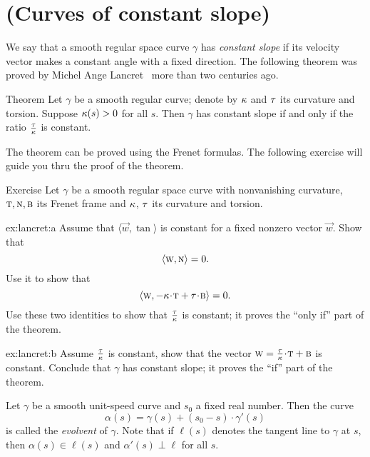 \section{(Curves of constant slope)}

We say that a smooth regular space curve $\gamma$ has \emph{constant slope} if its velocity vector makes a constant angle with a fixed direction.
The following theorem was proved by Michel Ange Lancret~\cite{lancret} more than two centuries ago.

\begin{thm}{Theorem}\label{thm:const-slope}
Let $\gamma$ be a smooth regular curve;
denote by $\kappa$ and $\tau$ its curvature and torsion.
Suppose $\kappa(s)>0$ for all $s$.
Then $\gamma$ has constant slope if and only if the ratio $\tfrac{\tau}{\kappa}$ is constant.
\end{thm}

The theorem can be proved using the Frenet formulas.
The following exercise will guide you thru the proof of the theorem. 

\begin{thm}{Exercise} \label{ex:lancret}
Let $\gamma$ be a smooth regular space curve with nonvanishing curvature, $\textsc{t},\textsc{n},\textsc{b}$ 
its Frenet frame and $\kappa$, $\tau$ its curvature and torsion.

\begin{subthm}{ex:lancret:a}
Assume that  $\langle \vec w,\tan\rangle$ is constant for a fixed nonzero vector $\vec w$.
Show that 
\[\langle \textsc w, \textsc{n}\rangle =0.\]
Use it to show that 
\[\langle \vec w, -\kur\cdot\tan+\tor\cdot \bi\rangle =0.\]
Use these two identities to show that $\tfrac{\tau}{\kappa}$ is constant;
it proves the ``only if'' part of the theorem.
\end{subthm}

\begin{subthm}{ex:lancret:b} Assume $\tfrac{\tau}{\kappa}$ is constant, show that the vector $\vec w=\tfrac\tor\kur\cdot \tan+\bi$ is constant.
Conclude that $\gamma$ has constant slope; it proves the ``if'' part of the theorem.
\end{subthm}

\end{thm}

Let $\gamma$ be a smooth unit-speed curve and $s_0$ a fixed real number. 
Then the curve 
\[\alpha(s)=\gamma(s)+(s_0-s)\cdot \gamma'(s)\]
is called the \emph{evolvent} of $\gamma$.
Note that if $\ell(s)$ denotes the tangent line to $\gamma$ at $s$,
then $\alpha(s)\in \ell(s)$ and $\alpha'(s)\perp \ell$ for all $s$.

